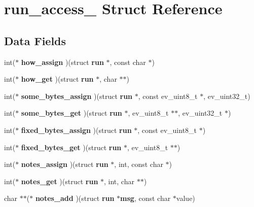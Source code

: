 \section{run\-\_\-access\-\_\- \-Struct \-Reference}
\label{structrun__access__}
\subsection*{\-Data \-Fields}
\begin{DoxyCompactItemize}
\item 
int($\ast$ {\bfseries how\-\_\-assign} )(struct {\bf run} $\ast$, const char $\ast$)\label{structrun__access___aecbcf345343126b414ca9a34a990d353}

\item 
int($\ast$ {\bfseries how\-\_\-get} )(struct {\bf run} $\ast$, char $\ast$$\ast$)\label{structrun__access___ac3cf5e0370e419ee4f22c75cf3e3f540}

\item 
int($\ast$ {\bfseries some\-\_\-bytes\-\_\-assign} )(struct {\bf run} $\ast$, const ev\-\_\-uint8\-\_\-t $\ast$, ev\-\_\-uint32\-\_\-t)\label{structrun__access___a8513a1f6c5dc3ec3396a66c0ef4f0ea5}

\item 
int($\ast$ {\bfseries some\-\_\-bytes\-\_\-get} )(struct {\bf run} $\ast$, ev\-\_\-uint8\-\_\-t $\ast$$\ast$, ev\-\_\-uint32\-\_\-t $\ast$)\label{structrun__access___a4bf7c96abc53866418460e1e456ac946}

\item 
int($\ast$ {\bfseries fixed\-\_\-bytes\-\_\-assign} )(struct {\bf run} $\ast$, const ev\-\_\-uint8\-\_\-t $\ast$)\label{structrun__access___a028553adb1ec10b2ce10c05eb1277860}

\item 
int($\ast$ {\bfseries fixed\-\_\-bytes\-\_\-get} )(struct {\bf run} $\ast$, ev\-\_\-uint8\-\_\-t $\ast$$\ast$)\label{structrun__access___afbcb3628b2876dc567c98ac8f1acd638}

\item 
int($\ast$ {\bfseries notes\-\_\-assign} )(struct {\bf run} $\ast$, int, const char $\ast$)\label{structrun__access___aad719eacc0e34912c99eff95aed749b2}

\item 
int($\ast$ {\bfseries notes\-\_\-get} )(struct {\bf run} $\ast$, int, char $\ast$$\ast$)\label{structrun__access___a5cc12290c294f49a99eb3ac361c7f8ce}

\item 
char $\ast$$\ast$($\ast$ {\bfseries notes\-\_\-add} )(struct {\bf run} $\ast${\bf msg}, const char $\ast$value)\label{structrun__access___ac61fcc00d6f74f09092ecc2c9d1e6fc0}


\end{DoxyCompactItemize}
